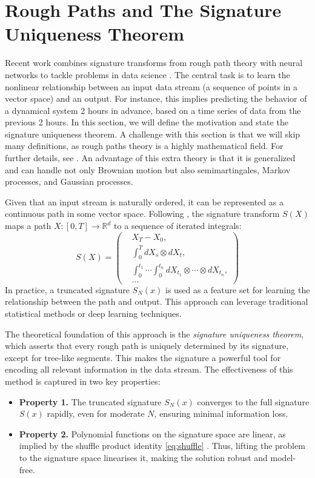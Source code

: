 \section{Rough Paths and The Signature Uniqueness Theorem}

Recent work combines signature transforms from rough path theory with neural networks to tackle problems in data science \cite{fermanian2023new, cass2024lecture}. The central task is to learn the nonlinear relationship between an input data stream (a sequence of points in a vector space)
and an output.
For instance, this implies predicting the behavior of a dynamical system 2 hours in advance, based on a time series of data from the previous 2 hours.
In this section, we will define the motivation and state the signature uniqueness theorem. A challenge with this section is that we will skip many definitions, as rough paths theory is a highly mathematical field. For further details, see \cite{boedihardjo2016signature}.
An advantage of this extra theory is that it is generalized and can handle not only Brownian motion but also semimartingales, Markov processes, and Gaussian processes.

Given that an input stream is naturally ordered, it can be represented as a continuous path in some vector space. Following \cite{geng2021introduction}, the signature transform \( S(X) \) maps a path \( X: [0, T] \to \mathbb{R}^d \) to a sequence of  iterated integrals:
\[
  S(X) = \left(  \begin{aligned}
 & X_{T} - X_{0},    \\
   &   \int_0^T \! dX_s \otimes dX_t, \\
 & \int_0^{t_1} \cdots \int_0^{t_n} dX_{t_1} \otimes \cdots \otimes dX_{t_n}, \\
  & \dots
    \end{aligned}\right)
\]
In practice, a truncated signature \( S_N(x) \) is used as a feature set for learning the relationship between the path and output. This approach can leverage traditional statistical methods or deep learning techniques.

The theoretical foundation of this approach is the \textit{signature uniqueness theorem}, which asserts that every rough path is uniquely determined by its signature, except for tree-like segments. This makes the signature a powerful tool for encoding all relevant information in the data stream. The effectiveness of this method is captured in two key properties:

\begin{itemize}
    \item \textbf{Property 1.} The truncated signature \( S_N(x) \) converges to the full signature \( S(x) \) rapidly, even for moderate \( N \), ensuring minimal information loss.

    \item \textbf{Property 2.} Polynomial functions on the signature space are linear, as implied by the shuffle product identity \eqref{eq:shuffle} . Thus, lifting the problem to the signature space linearises it, making the solution robust and model-free.
\end{itemize}


